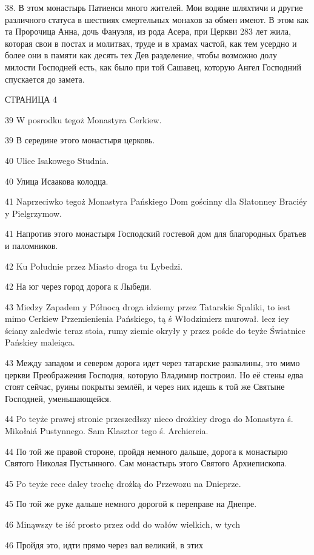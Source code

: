 38. В этом монастырь Патиенси много жителей. Мои водяне шляхтичи и другие различного статуса в шествиях смертельных монахов за обмен имеют. В этом как та Пророчица Анна, дочь Фануэля, из рода Асера, при Церкви 283 лет жила, которая свои в постах и молитвах, труде и в храмах частой, как тем усердно и более они в памяти как десять тех Дев разделение, чтобы возможно долу милости Господней есть, как было при той Сашавец, которую Ангел Господний спускается до замета.




СТРАНИЦА 4

39 W posrodku tegoż Monastyra Cerkiew.

39 В середине этого монастыря церковь.


40 Ulice Isakowego Studnia.

40 Улица Исаакова колодца.


41 Naprzeciwko tegoż Monastyra Pańskiego Dom gościnny dla Słatonney Braciéy y Pielgrzymow.

41 Напротив этого монастыря Господский гостевой дом для благородных братьев и паломников.


42 Ku Południe przez Miasto droga tu Lybedzi.

42 На юг через город дорога к Лыбеди.

43 Miedzy Zapadem y Północą droga idziemy przez Tatarskie Spaliki, to iest mimo Cerkiew Przemienienia Pańskiego, tą ś Włodzimierz murował. lecz iey ściany zaledwie teraz stoia, rumy ziemie okryły y przez pośde do teyże Światnice Pańskiey maleiąca.

43 Между западом и севером дорога идет через татарские развалины, это мимо церкви Преображения Господня, которую Владимир построил. Но её стены едва стоят сейчас, руины покрыты землёй, и через них идешь к той же Святыне Господней, уменьшающейся.


44 Po teyże prawej stronie przeszedłszy nieco drożkiey droga do Monastyra ś. Mikołaiá Pustynnego. Sam Klasztor tego ś. Archiereia.

44 По той же правой стороне, пройдя немного дальше, дорога к монастырю Святого Николая Пустынного. Сам монастырь этого Святого Архиепископа.

45 Po teyże rece daley trochę drożką do Przewozu na Dnieprze.

45 По той же руке дальше немного дорогой к переправе на Днепре.

46 Minąwszy te iść prosto przez odd do wałów wielkich, w tych

46 Пройдя это, идти прямо через вал великий, в этих

